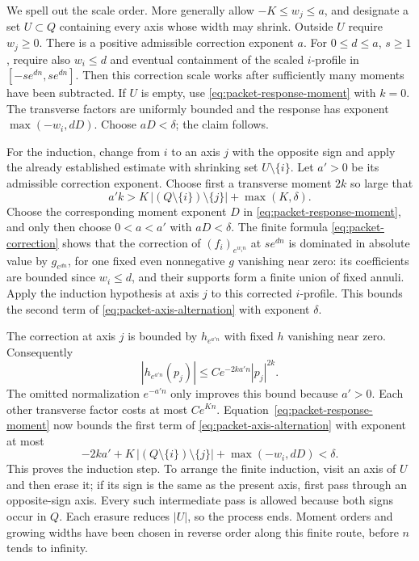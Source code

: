 We spell out the scale order. More generally allow $-K\leq w_j\leq a$,
and designate a set $U\subset Q$ containing every axis whose width may
shrink. Outside $U$ require $w_j\geq0$. There is a positive admissible
correction exponent $a$. For $0\leq d\leq a$, $s\geq1$, require also
$w_i\leq d$ and eventual containment of the scaled $i$-profile in
$[-s e^{dn},s e^{dn}]$. Then this correction scale works after sufficiently
many moments have been subtracted. If $U$ is empty, use \eqref{eq:packet-response-moment}
with $k=0$. The transverse factors are uniformly bounded and the response
has exponent $\max(-w_i,dD)$. Choose $aD<\delta$; the claim follows.

For the induction, change from $i$ to an axis $j$ with the opposite sign
and apply the already established estimate with shrinking set
$U\setminus\{i\}$. Let $a'>0$ be its admissible correction exponent.
Choose first a transverse moment $2k$ so large that
\[
 a'k>K\,|(Q\setminus\{i\})\setminus\{j\}|+\max(K,\delta).
\]
Choose the corresponding moment exponent $D$ in
\eqref{eq:packet-response-moment}, and only then choose
$0<a<a'$ with $aD<\delta$.
The finite formula \eqref{eq:packet-correction} shows that the correction
of $(f_i)_{e^{w_in}}$ at $s e^{dn}$ is dominated in absolute value by
$g_{e^{dn}}$, for one fixed even nonnegative $g$ vanishing near zero:
its coefficients are bounded since $w_i\leq d$, and their supports form
a finite union of fixed annuli. Apply the induction hypothesis at axis
$j$ to this corrected $i$-profile. This bounds the second term of
\eqref{eq:packet-axis-alternation} with exponent $\delta$.

The correction at axis $j$ is bounded by $h_{e^{a'n}}$ with fixed $h$
vanishing near zero. Consequently
\[
 |h_{e^{a'n}}(p_j)|\leq C e^{-2ka'n}|p_j|^{2k}.
\]
The omitted normalization $e^{-a'n}$ only improves this bound because
$a'>0$. Each other transverse factor costs at most $Ce^{Kn}$.
Equation~\eqref{eq:packet-response-moment} now bounds the first term of
\eqref{eq:packet-axis-alternation} with exponent at most
\[
 -2ka'+K\,|(Q\setminus\{i\})\setminus\{j\}|+
       \max(-w_i,dD)<\delta.
\]
This proves the induction step. To arrange the finite induction, visit
an axis of $U$ and then erase it; if its sign is the same as the present
axis, first pass through an opposite-sign axis. Every such intermediate
pass is allowed because both signs occur in $Q$. Each erasure reduces
$|U|$, so the process ends. Moment orders and growing widths have been
chosen in reverse order along this finite route, before $n$ tends to infinity.

